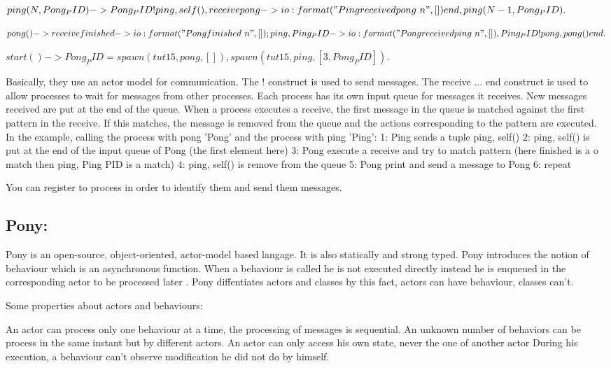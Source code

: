 \documentclass[11pt]{article} %
\begin{document}
$ping(N, Pong_PID) ->
    Pong_PID ! {ping, self()},
    receive
        pong ->
            io:format("Ping received pong~n", [])
    end,
    ping(N - 1, Pong_PID).$

$pong() ->
    receive
        finished ->
            io:format("Pong finished~n", []);
        {ping, Ping_PID} ->
            io:format("Pong received ping~n", []),
            Ping_PID ! pong,
            pong()
    end.$

$start() ->
    Pong_PID = spawn(tut15, pong, []),
    spawn(tut15, ping, [3, Pong_PID]).$

Basically, they use an actor model for communication.
The ! construct is used to send messages.
The receive ... end construct is used to allow processes to wait for messages from other processes.
Each process has its own input queue for messages it receives. New messages received are put at the end of the queue. 
When a process executes a receive, the first message in the queue is matched against the first pattern in the receive.
If this matches, the message is removed from the queue and the actions corresponding to the pattern are executed.
In the example, calling the process with pong 'Pong' and the process with ping 'Ping':
1: Ping sends a tuple {ping, self()}
2: {ping, self()} is put at the end of the input queue of Pong (the first element here)
3: Pong execute a receive and try to match pattern (here finished is a  o match then {ping, Ping PID} is a match)
4: {ping, self()} is remove from the queue
5: Pong print and send a message to Pong
6: repeat

You can register to process in order to identify them and send them messages.

\subsection{Pony:}
Pony is an open-source, object-oriented, actor-model based langage. It is also statically and strong typed.
Pony introduces the notion of behaviour which is an asynchronous function.
When a  behaviour is called he is not executed directly instead he is enqueued in the corresponding actor to be processed later .
Pony diffentiates actors and classes by this fact, actors can have behaviour, classes can't.

Some properties about actors and behaviours:

An actor can process only one behaviour at a time, the processing of messages is sequential.
An unknown number of behaviors can be process in the same instant but by different actors.
    An actor can only access his own state, never the one of another actor
    During his execution, a behaviour can't observe modification he did not do by himself.
\end{document}
